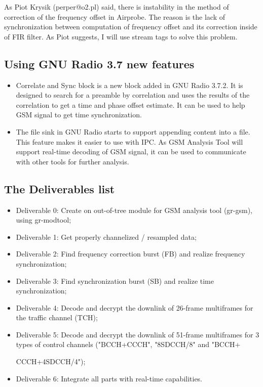 \documentclass[a4paper,12pt,oneside]{article}
\begin{document}
As Piot Krysik (perper@o2.pl) said, there is instability in the method of correction of the frequency offset in Airprobe. The reason is the lack of synchronization between computation of frequency offset and its correction inside of FIR filter. As Piot suggests, I will use stream tags to solve this problem.

\subsection{Using GNU Radio 3.7 new features}
\begin{itemize}
\item Correlate and Sync block is a new block added in GNU Radio 3.7.2. It is designed
to search for a preamble by correlation and uses the results of the
correlation to get a time and phase offset estimate.
It can be used to help GSM signal to get time synchronization.

\item The file sink in GNU Radio starts to support appending content into a file. This feature makes it easier to use with IPC.
As GSM Analysis Tool will support real-time decoding of GSM signal, it can be used to communicate with other tools for
further analysis.
\end{itemize}

\subsection{The Deliverables list}
\begin{itemize}
\item Deliverable 0: Create on out-of-tree module for GSM analysis tool (gr-gsm), using gr-modtool;
\item Deliverable 1: Get properly channelized / resampled data;
\item Deliverable 2: Find frequency correction burst (FB) and realize frequency synchronization;
\item Deliverable 3: Find synchronization burst (SB) and realize time synchronization;
\item Deliverable 4: Decode and decrypt the downlink of 26-frame multiframes for the traffic channel (TCH);
\item Deliverable 5: Decode and decrypt the downlink of 51-frame multiframes for 3 types of control channels ("BCCH+CCCH", "8SDCCH/8" and "BCCH+

    CCCH+4SDCCH/4");
\item Deliverable 6: Integrate all parts with real-time capabilities.
\end{itemize}
\end{document}

